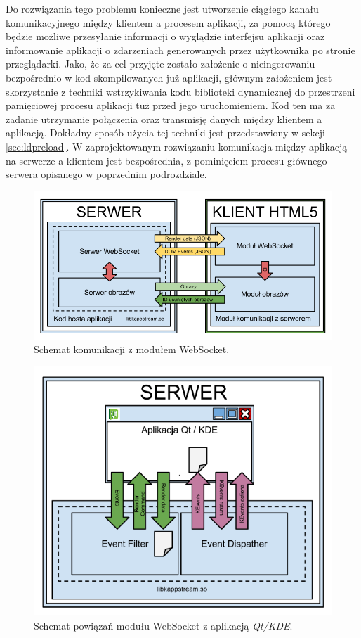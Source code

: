 Do rozwiązania tego problemu konieczne jest utworzenie ciągłego kanału komunikacyjnego między klientem a procesem aplikacji, za pomocą którego będzie możliwe przesyłanie informacji o wyglądzie interfejsu aplikacji oraz informowanie aplikacji o zdarzeniach generowanych przez użytkownika po stronie przeglądarki. Jako, że za cel przyjęte zostało założenie o nieingerowaniu bezpośrednio w kod skompilowanych już aplikacji, głównym założeniem jest skorzystanie z techniki wstrzykiwania kodu biblioteki dynamicznej do przestrzeni pamięciowej procesu aplikacji tuż przed jego uruchomieniem. Kod ten ma za zadanie utrzymanie połączenia oraz transmisję danych między klientem a aplikacją. Dokładny sposób użycia tej techniki jest przedstawiony w sekcji \ref{sec:ldpreload}. W zaprojektowanym rozwiązaniu komunikacja między aplikacją na serwerze a klientem jest bezpośrednia, z pominięciem procesu głównego serwera opisanego w poprzednim podrozdziale.

\begin{figure}[H]
\centering
\includegraphics[width=1.0\linewidth]{img/arch-socket}
\caption{Schemat komunikacji z modułem WebSocket.}
\label{fig:arch-socket}
\end{figure}

\begin{figure}[H]
\centering
\includegraphics[width=1.0\linewidth]{img/arch-hook}
\caption{Schemat powiązań modułu WebSocket z aplikacją \emph{Qt/KDE}.}
\label{fig:arch-hook}
\end{figure}